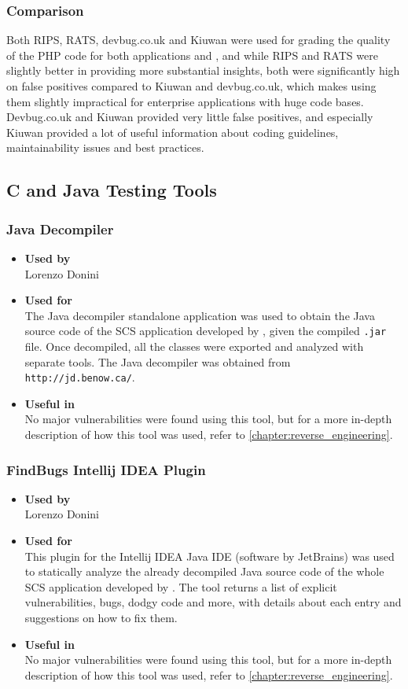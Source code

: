 \subsubsection*{Comparison}
Both RIPS, RATS, devbug.co.uk and Kiuwan were used for grading the quality of the PHP code for both applications \bs{} and \gnb{}, and while RIPS and RATS were slightly better in providing more substantial insights, both were significantly high on false positives compared to Kiuwan and devbug.co.uk, which makes using them slightly impractical for enterprise applications with huge code bases. Devbug.co.uk and Kiuwan provided very little false positives, and especially Kiuwan provided a lot of useful information about coding guidelines, maintainability issues and best practices.

\subsection*{C and Java Testing Tools}

\subsubsection*{Java Decompiler}
\begin{itemize}
	\item \textbf{Used by}\\ Lorenzo Donini
	\item \textbf{Used for}\\ The Java decompiler standalone application was used to obtain the Java source code of the SCS application developed by \bs, given the compiled \texttt{.jar} file. Once decompiled, all the classes were exported and analyzed with separate tools. The Java decompiler was obtained from \texttt{http://jd.benow.ca/}.
	\item \textbf{Useful in}\\ No major vulnerabilities were found using this tool, but for a more in-depth description of how this tool was used, refer to \autoref{chapter:reverse_engineering}.
\end{itemize}

\subsubsection*{FindBugs Intellij IDEA Plugin}
\begin{itemize}
	\item \textbf{Used by}\\ Lorenzo Donini
	\item \textbf{Used for}\\ This plugin for the Intellij IDEA Java IDE (software by JetBrains) was used to statically analyze the already decompiled Java source code of the whole SCS application developed by \bs. The tool returns a list of explicit vulnerabilities, bugs, dodgy code and more, with details about each entry and suggestions on how to fix them.
	\item \textbf{Useful in}\\ No major vulnerabilities were found using this tool, but for a more in-depth  description of how this tool was used, refer to \autoref{chapter:reverse_engineering}.
\end{itemize}

